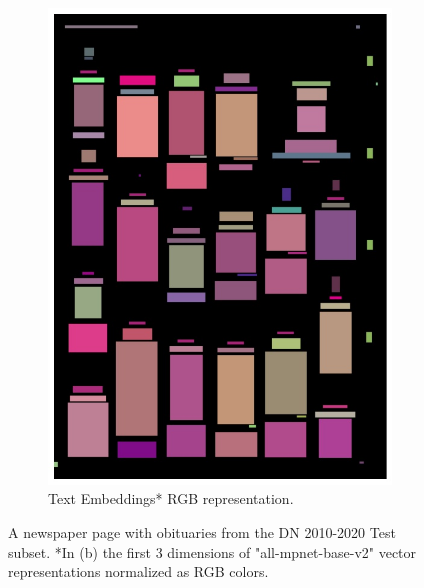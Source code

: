 \documentclass[oneside, english, bibtex]{kththesis}
\begin{document}
\begin{figure}[!htb]
\begin{adjustbox}{center,max size={\textwidth}{0.9\textheight}}
{\begin{subfigure}{0.75\textwidth}
  \includegraphics[width=\linewidth, clip=true, trim = 0mm 0mm 0mm 0mm]{figures/tf/GQU6vjW.jpg}
  \caption{Text Embeddings* RGB representation.}
  \label{fig:GQU6vjW_tf}
\end{subfigure}}
\end{adjustbox}
  \caption{A newspaper page with obituaries from the DN 2010-2020 Test subset. *In (b) the first 3 dimensions of "all-mpnet-base-v2" vector representations normalized as RGB colors.}
\label{fig:GQU6vjW_tf_comp}
\end{figure}

\clearpage
\end{document}
